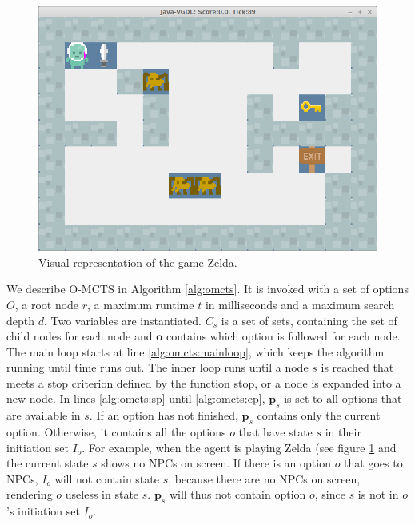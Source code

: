 \begin{figure}
	\centering
	\includegraphics[width=\columnwidth]{includes/zelda}
	\caption{Visual representation of the game Zelda.}
	\label{fig:zelda}
\end{figure}


We describe O-MCTS in Algorithm \ref{alg:omcts}. It is invoked with a set of
options $O$, a root node $r$, a maximum runtime $t$ in milliseconds and a
maximum search depth $d$. Two variables are instantiated. $C_s$ is a set of
sets, containing the set of child nodes for each node and $\mathbf{o}$ contains
which option is followed for each node. The main loop starts at line
\ref{alg:omcts:mainloop}, which keeps the algorithm running until time runs out.
The inner loop runs until a node $s$ is reached that meets a stop criterion
defined by the function \textsf{stop}, or a node is expanded into a new node.
In lines \ref{alg:omcts:sp} until \ref{alg:omcts:ep}, $\mathbf{p}_s$ is set to
all options that are available in $s$. If an option has not finished,
$\mathbf{p}_s$ contains only the current option. Otherwise, it contains all the options $o$ that have state $s$ in their
initiation set $I_o$. For example, when the agent is playing Zelda (see figure
\ref{fig:zelda} and the current
state $s$ shows no NPCs on screen. If there is an option $o$ that goes to NPCs,
$I_o$ will not contain state $s$, because there are no NPCs on screen, rendering
$o$ useless in state $s$. $\mathbf{p}_s$ will thus not contain option $o$, since
$s$ is not in $o$'s initiation set $I_o$.

